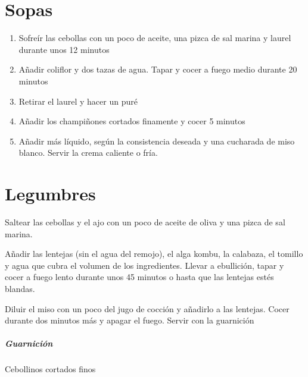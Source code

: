 \documentclass[letterpaper]{recipe}
\renewcommand{\inghead}{\textbf{Ingredientes (para 2 raciones)}:\ }
\begin{document}
\chapter{Sopas}
\begin{enumerate}
\item Sofreír las cebollas con un poco de aceite, una pizca de sal marina y laurel durante unos 12 minutos
\item Añadir coliflor y dos tazas de agua. Tapar y cocer a fuego medio durante 20 minutos
\item Retirar el laurel y hacer un puré
\item Añadir los champiñones cortados finamente y cocer 5 minutos
\item Añadir más líquido, según la consistencia deseada y una cucharada de miso blanco. Servir la crema caliente o fría.
\end{enumerate}
\chapter{Legumbres}
\renewcommand{\inghead}{\textbf{Ingredientes (para 3 raciones)}:\ }

Saltear las cebollas y el ajo con un poco de aceite de oliva y una pizca de sal marina.

Añadir las lentejas (sin el agua del remojo), el alga kombu, la calabaza, el tomillo y agua que cubra el volumen de los ingredientes. Llevar a ebullición, tapar y cocer a fuego lento durante unos 45 minutos o hasta que las lentejas estés blandas.

Diluir el miso con un poco del jugo de cocción y añadirlo a las lentejas. Cocer durante dos minutos más y apagar el fuego. Servir con la guarnición
\paragraph*{Guarnición} Cebollinos cortados finos
\tableofcontents
\end{document}

